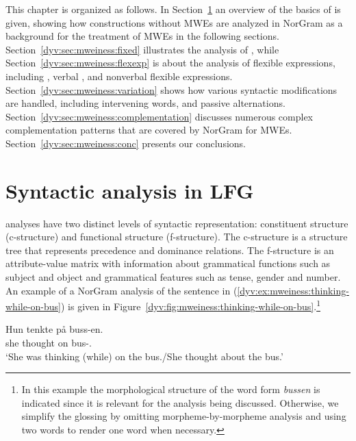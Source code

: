 \documentclass[output=paper]{langsci/langscibook}
\begin{document}
This chapter is organized as follows.
In Section~\ref{dyv:sec:mweiness:LFG} an overview of the basics of  is given, showing how constructions without MWEs are analyzed in NorGram as a background for the treatment of MWEs in the following sections.
Section~\ref{dyv:sec:mweiness:fixed} illustrates the analysis of , while Section~\ref{dyv:sec:mweiness:flexexp} is about the analysis of flexible expressions, including , verbal , and nonverbal flexible expressions.
Section~\ref{dyv:sec:mweiness:variation} shows how various syntactic modifications are handled, including intervening words,  and passive alternations.
Section~\ref{dyv:sec:mweiness:complementation} discusses numerous complex complementation patterns that are covered by NorGram for  MWEs.
Section~\ref{dyv:sec:mweiness:conc} presents our conclusions.

\section{Syntactic analysis in LFG}\label{dyv:sec:mweiness:LFG}

 analyses have two distinct levels of syntactic representation: constituent structure (c-structure) and functional structure (f-structure).
The c-structure is a  structure tree that represents precedence and dominance relations.
The f-structure is an attribute-value matrix with information about grammatical functions such as subject and object and grammatical features such as tense, gender and number.
An example of a NorGram analysis of the sentence in (\ref{dyv:ex:mweiness:thinking-while-on-bus}) is given in Figure~\ref{dyv:fig:mweiness:thinking-while-on-bus}.\footnote{In this example the morphological structure of the word form \textit{bussen} is indicated since it is relevant for the analysis being discussed.
Otherwise, we simplify the glossing by omitting morpheme-by-morpheme analysis and using two  words to render one  word when necessary.}

\ea\label{dyv:ex:mweiness:thinking-while-on-bus}
\gll Hun tenkte på buss-en. \\
     she thought on bus-{}.{\sg}\\
\glt `She was thinking (while) on the bus./She thought about the bus.’
\z
\end{document}
